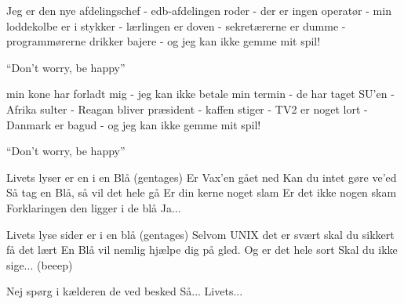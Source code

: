 \documentclass[a4paper,11pt]{article}
\begin{document}
\begin{song}
   Jeg er den nye afdelingschef - edb-afdelingen roder - der
  er ingen operatør - min loddekolbe er i stykker - lærlingen er
  doven - sekretærerne er dumme - programmørerne drikker bajere - og
  jeg kan ikke gemme mit spil!

  "`Don't worry, be happy"'

   min kone har forladt mig - jeg kan ikke betale min termin
  - de har taget SU'en - Afrika sulter - Reagan bliver præsident -
  kaffen stiger - TV2 er noget lort - Danmark er bagud - og jeg kan
  ikke gemme mit spil!

  "`Don't worry, be happy"'


  Livets lyser er en i en Blå
  (gentages)
  Er Vax'en gået ned
  Kan du intet gøre ve'ed
  Så tag en Blå, så vil det hele gå
  Er din kerne noget slam
  Er det ikke nogen skam
  Forklaringen den ligger i de blå
  Ja...

  Livets lyse sider er i en blå
  (gentages)
  Selvom UNIX det er svært
  skal du sikkert få det lært
  En Blå vil nemlig hjælpe dig på gled.
  Og er det hele sort
  Skal du ikke sige... (beeep)

  Nej spørg i kælderen de ved besked
  Så...
  Livets...


\end{song}
\end{document}
